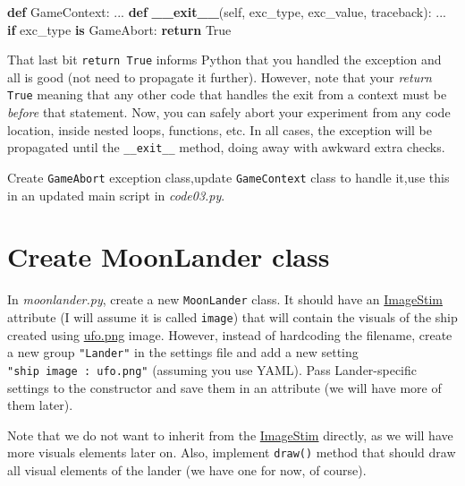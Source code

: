 \documentclass[
]{book}
\newenvironment{Shaded}{\begin{snugshade}}{\end{snugshade}}
\newcommand{\ControlFlowTok}[1]{\textcolor[rgb]{0.13,0.29,0.53}{\textbf{#1}}}
\newcommand{\FunctionTok}[1]{\textcolor[rgb]{0.13,0.29,0.53}{\textbf{#1}}}
\newcommand{\KeywordTok}[1]{\textcolor[rgb]{0.13,0.29,0.53}{\textbf{#1}}}
\newcommand{\NormalTok}[1]{#1}
\newcommand{\VariableTok}[1]{\textcolor[rgb]{0.00,0.00,0.00}{#1}}
\begin{document}
\begin{Shaded}
\begin{Highlighting}[]
\KeywordTok{def}\NormalTok{ GameContext:}
\NormalTok{    ...}
    \KeywordTok{def} \FunctionTok{\_\_exit\_\_}\NormalTok{(}\VariableTok{self}\NormalTok{, exc\_type, exc\_value, traceback):}
\NormalTok{        ...}
        \ControlFlowTok{if}\NormalTok{ exc\_type }\KeywordTok{is}\NormalTok{ GameAbort:}
            \ControlFlowTok{return} \VariableTok{True}
  
\end{Highlighting}
\end{Shaded}

That last bit \texttt{return\ True} informs Python that you handled the exception and all is good (not need to propagate it further). However, note that your \emph{return} \texttt{True} meaning that any other code that handles the exit from a context must be \emph{before} that statement. Now, you can safely abort your experiment from any code location, inside nested loops, functions, etc. In all cases, the exception will be propagated until the \texttt{\_\_exit\_\_} method, doing away with awkward extra checks.

Create \texttt{GameAbort} exception class,update \texttt{GameContext} class to handle it,use this in an updated main script in \emph{code03.py}.

\hypertarget{create-moonlander-class}{%
\section{Create MoonLander class}\label{create-moonlander-class}}

In \emph{moonlander.py}, create a new \texttt{MoonLander} class. It should have an \href{https://psychopy.org/api/visual/imagestim.html}{ImageStim} attribute (I will assume it is called \texttt{image}) that will contain the visuals of the ship created using \href{material/ufo.png}{ufo.png} image. However, instead of hardcoding the filename, create a new group \texttt{"Lander"} in the settings file and add a new setting \texttt{"ship\ image\ :\ ufo.png"} (assuming you use YAML). Pass Lander-specific settings to the constructor and save them in an attribute (we will have more of them later).

Note that we do not want to inherit from the \href{https://psychopy.org/api/visual/imagestim.html}{ImageStim} directly, as we will have more visuals elements later on. Also, implement \texttt{draw()} method that should draw all visual elements of the lander (we have one for now, of course).
\end{document}
